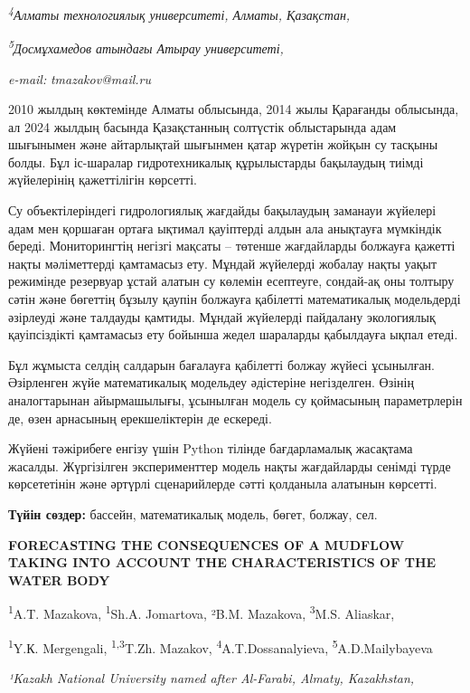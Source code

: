 \documentclass[
]{article}
\begin{document}
\emph{\textsuperscript{4}Алматы технологиялық университеті, Алматы,
Қазақстан,}

\emph{\textsuperscript{5}Досмұхамедов атындағы Атырау университеті,}

\emph{e-mail:} \emph{tmazakov@mail.ru}

2010 жылдың көктемінде Алматы облысында, 2014 жылы Қарағанды
\hspace{0pt}\hspace{0pt}облысында, ал 2024 жылдың басында Қазақстанның
солтүстік облыстарында адам шығынымен және айтарлықтай шығынмен қатар
жүретін жойқын су тасқыны болды. Бұл іс-шаралар гидротехникалық
құрылыстарды бақылаудың тиімді жүйелерінің қажеттілігін көрсетті.

Су объектілеріндегі гидрологиялық жағдайды бақылаудың заманауи жүйелері
адам мен қоршаған ортаға ықтимал қауіптерді алдын ала анықтауға
мүмкіндік береді. Мониторингтің негізгі мақсаты -- төтенше жағдайларды
болжауға қажетті нақты мәліметтерді қамтамасыз ету. Мұндай жүйелерді
жобалау нақты уақыт режимінде резервуар ұстай алатын су көлемін
есептеуге, сондай-ақ оны толтыру сәтін және бөгеттің бұзылу қаупін
болжауға қабілетті математикалық модельдерді әзірлеуді және талдауды
қамтиды. Мұндай жүйелерді пайдалану экологиялық қауіпсіздікті қамтамасыз
ету бойынша жедел шараларды қабылдауға ықпал етеді.

Бұл жұмыста селдің салдарын бағалауға қабілетті болжау жүйесі ұсынылған.
Әзірленген жүйе математикалық модельдеу әдістеріне негізделген. Өзінің
аналогтарынан айырмашылығы, ұсынылған модель су қоймасының параметрлерін
де, өзен арнасының ерекшеліктерін де ескереді.

Жүйені тәжірибеге енгізу үшін Python тілінде бағдарламалық жасақтама
жасалды. Жүргізілген эксперименттер модель нақты жағдайларды сенімді
түрде көрсететінін және әртүрлі сценарийлерде сәтті қолданыла алатынын
көрсетті.

\textbf{Түйін сөздер:} бассейн, математикалық модель, бөгет, болжау,
сел.

\textbf{FORECASTING THE CONSEQUENCES OF A MUDFLOW TAKING INTO ACCOUNT
THE CHARACTERISTICS OF THE WATER BODY}

\textsuperscript{1}A.T. Mazakova, \textsuperscript{1}Sh.A. Jomartova,
²B.M. Mazakova, \textsuperscript{3}M.S. Aliaskar,

\textsuperscript{1}Y.К. Mergengali, \textsuperscript{1,3}T.Zh. Mazakov,
\textsuperscript{4}A.T.Dossanalyieva, \textsuperscript{5}A.D.Mailybayeva

\emph{¹Kazakh National University named after Al-Farabi, Almaty,
Kazakhstan,}
\end{document}
